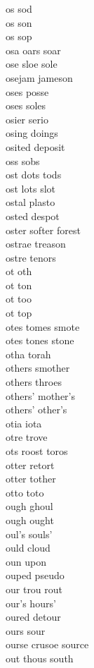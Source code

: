 os sod \\
os son \\
os sop \\
osa oars soar \\
ose sloe sole \\
osejam jameson \\
oses posse \\
oses soles \\
osier serio\\
osing doings \\
osited deposit \\
oss sobs \\
ost dots tods \\
ost lots slot \\
ostal plasto \\
osted despot \\
oster softer forest \\
ostrae treason \\
ostre tenors \\
ot oth \\
ot ton \\
ot too \\
ot top \\
otes tomes smote \\
otes tones stone \\
otha torah \\
others smother \\
others throes\\
others' mother's \\
others' other's\\
otia iota\\
otre trove \\
ots roost toros  \\
otter retort \\
otter tother \\
otto toto\\
ough ghoul \\
ough ought \\
oul's souls' \\
ould cloud \\
oun upon \\
ouped pseudo \\
our trou rout \\
our's hours' \\
oured detour \\
ours sour\\
ourse crusoe source \\
out thous south  \\
